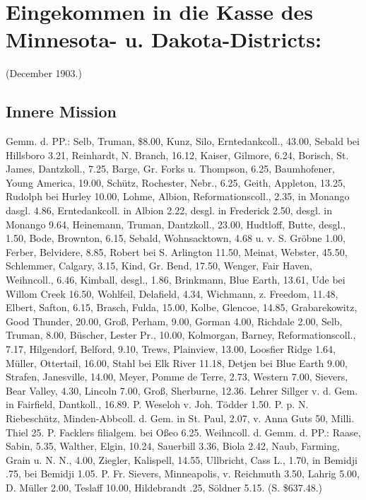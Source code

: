 \chapter[Kasse des Minnesota- u. Dakota-Districts:]{Eingekommen in die Kasse des Minnesota- u. Dakota-Districts:}

(December 1903.)

\section{Innere Mission}

Gemm. d. PP.: Selb, Truman, \$8.00, Kunz, Silo, Erntedankcoll., 43.00, Sebald bei Hillsboro 3.21, Reinhardt, N. Branch, 16.12, Kaiser, Gilmore, 6.24, Borisch, St. James, Dantzkoll., 7.25, Barge, Gr. Forks u. Thompson, 6.25, Baumhofener, Young America, 19.00, Schütz, Rochester, Nebr., 6.25, Geith, Appleton, 13.25, Rudolph bei Hurley 10.00, Lohme, Albion, Reformationscoll., 2.35, in Monango dasgl. 4.86, Erntedankcoll. in Albion 2.22, desgl. in Frederick 2.50, desgl. in Monango 9.64, Heinemann, Truman, Dantzkoll., 23.00, Hudtloff, Butte, desgl., 1.50, Bode, Brownton, 6.15, Sebald, Wohnsacktown, 4.68 u. v. S. Gröbne 1.00, Ferber, Belvidere, 8.85, Robert bei S. Arlington 11.50, Meinat, Webster, 45.50, Schlemmer, Calgary, 3.15, Kind, Gr. Bend, 17.50, Wenger, Fair Haven, Weihncoll., 6.46, Kimball, desgl., 1.86, Brinkmann, Blue Earth, 13.61, Ude bei Willom Creek 16.50, Wohlfeil, Delafield, 4.34, Wichmann, z. Freedom, 11.48, Elbert, Safton, 6.15, Brasch, Fulda, 15.00, Kolbe, Glencoe, 14.85, Grabarekowitz, Good Thunder, 20.00, Groß, Perham, 9.00, Gorman 4.00, Richdale 2.00, Selb, Truman, 8.00, Büscher, Lester Pr., 10.00, Kolmorgan, Barney, Reformationscoll., 7.17, Hilgendorf, Belford, 9.10, Trews, Plainview, 13.00, Loosfier Ridge 1.64, Müller, Ottertail, 16.00, Stahl bei Elk River 11.18, Detjen bei Blue Earth 9.00, Strafen, Janesville, 14.00, Meyer, Pomme de Terre, 2.73, Western 7.00, Sievers, Bear Valley, 4.30, Lincoln 7.00, Groß, Sherburne, 12.36. Lehrer Sillger v. d. Gem. in Fairfield, Dantkoll., 16.89. P. Weseloh v. Joh. Tödder 1.50. P. p. N. Riebeschütz, Minden-Abbcoll. d. Gem. in St. Paul, 2.07, v. Anna Guts 50, Milli. Thiel 25. P. Facklers filialgem. bei Oßeo 6.25. Weihncoll. d. Gemm. d. PP.: Raase, Sabin, 5.35, Walther, Elgin, 10.24, Sauerbill 3.36, Biola 2.42, Naub, Farming, Grain u. N. N., 4.00, Ziegler, Kalispell, 14.55, Ullbricht, Cass L., 1.70, in Bemidji .75, bei Bemidji 1.05. P. Fr. Sievers, Minneapolis, v. Reichmuth 3.50, Lahrig 5.00, D. Müller 2.00, Teslaff 10.00, Hildebrandt .25, Söldner 5.15. (S. \$637.48.)

